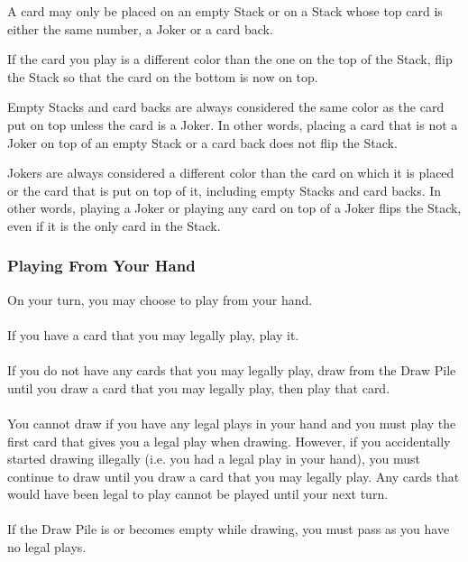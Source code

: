 \documentclass{article}
\begin{document}
A card may only be placed on an empty Stack or on a Stack whose top card is either the same number, a Joker or a card back.

If the card you play is a different color than the one on the top of the Stack, flip the Stack so that the card on the bottom is now on top.

Empty Stacks and card backs are always considered the same color as the card put on top unless the card is a Joker.
In other words, placing a card that is not a Joker on top of an empty Stack or a card back does not flip the Stack.

Jokers are always considered a different color than the card on which it is placed or the card that is put on top of it, including empty Stacks and card backs.
In other words, playing a Joker or playing any card on top of a Joker flips the Stack, even if it is the only card in the Stack.

\subsubsection{Playing From Your Hand}
\label{sec:fromhand}

On your turn, you may choose to play from your hand.

\paragraph{}
If you have a card that you may legally play, play it.

\paragraph{}
If you do not have any cards that you may legally play, draw from the Draw Pile until you draw a card that you may legally play, then play that card.

\paragraph{}
You cannot draw if you have any legal plays in your hand and you must play the first card that gives you a legal play when drawing.
However, if you accidentally started drawing illegally (i.e. you had a legal play in your hand), you must continue to draw until you draw a card that you may legally play. Any cards that would have been legal to play cannot be played until your next turn.

\paragraph{}
If the Draw Pile is or becomes empty while drawing, you must pass as you have no legal plays.
\end{document}
